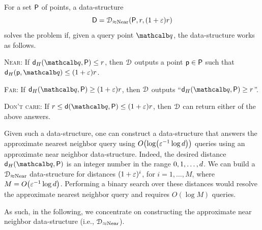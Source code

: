 \begin{defn}
    For a set ${\mathsf{P}}$ of points, a data-structure
    \[
    \DSC = \DSAprxNearNbr(\PntSet,r,(1+\eps)r)
    \]
    solves the
     problem if, given a query point
    $\query$, the data-structure works as follows.
    \begin{compactitem}
        \item \textsc{Near}: If $\distH{\query}{\PntSet} \leq r$, then
        $\EuScript{D}$ outputs a point $\mathsf{p} \in {\mathsf{P}}$ such that
        $\distH{\pnt}{\query} \leq (1+\eps)r$.
        
        \item \textsc{Far}: If $\distH{\query}{\PntSet} \geq
        (1+\eps) r$, then $\EuScript{D}$ outputs ``$\distH{\query}{\PntSet}
        \geq r$''.

        \item \textsc{Don't care}: If
        $r \leq \DistNN{\query}{\PntSet} \leq (1+\eps) r$, then $\EuScript{D}$
        can return either of the above answers.
    \end{compactitem}
\end{defn}

Given such a data-structure, one can construct a data-structure that
answers the approximate nearest neighbor query using $O\pth{ \log\pth{
      \eps^{-1} \log \hdim } }$ queries using an approximate near
neighbor data-structure.  Indeed, the desired distance
$\distH{\query}{\PntSet}$ is an integer number in the range $0,1,
\ldots, d$. We can build a $\DSAprxNearNbr$ data-structure for
distances $(1+{\varepsilon})^i$, for $i=1,\ldots, M$, where $M= O\pth{
   \eps^{-1}\log \hdim}$. Performing a binary search over these
distances would resolve the approximate nearest neighbor query and
requires $O( \log M)$ queries.

As such, in the following, we concentrate on constructing the
approximate near neighbor data-structure (i.e., $\DSAprxNearNbr$).






